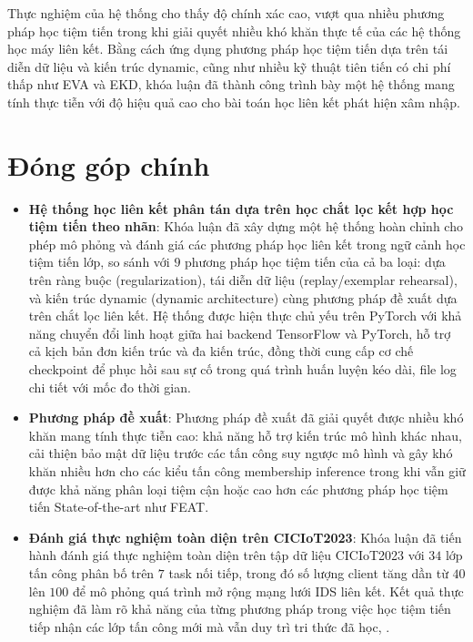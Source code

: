 Thực nghiệm của hệ thống cho thấy độ chính xác cao, vượt qua nhiều phương pháp học tiệm tiến trong khi giải quyết nhiều khó khăn thực tế của các hệ thống học máy liên kết. Bằng cách ứng dụng phương pháp học tiệm tiến dựa trên tái diễn dữ liệu và kiến trúc dynamic, cũng như nhiều kỹ thuật tiên tiến có chi phí thấp như EVA và EKD, khóa luận đã thành công trình bày một hệ thống mang tính thực tiễn với độ hiệu quả cao cho bài toán học liên kết phát hiện xâm nhập.

\section{Đóng góp chính}

\begin{itemize}
    \item \textbf{Hệ thống học liên kết phân tán dựa trên học chắt lọc kết hợp học tiệm tiến theo nhãn}: Khóa luận đã xây dựng một hệ thống hoàn chỉnh cho phép mô phỏng và đánh giá các phương pháp học liên kết trong ngữ cảnh học tiệm tiến lớp, so sánh với $9$ phương pháp học tiệm tiến của cả ba loại: dựa trên ràng buộc (regularization), tái diễn dữ liệu (replay/exemplar rehearsal), và kiến trúc dynamic (dynamic architecture) cùng phương pháp đề xuất dựa trên chắt lọc liên kết. Hệ thống được hiện thực chủ yếu trên PyTorch với khả năng chuyển đổi linh hoạt giữa hai backend TensorFlow và PyTorch, hỗ trợ cả kịch bản đơn kiến trúc và đa kiến trúc, đồng thời cung cấp cơ chế checkpoint để phục hồi sau sự cố trong quá trình huấn luyện kéo dài, file log chi tiết với mốc đo thời gian.
    
    \item \textbf{Phương pháp đề xuất}: Phương pháp đề xuất đã giải quyết được nhiều khó khăn mang tính thực tiễn cao: khả năng hỗ trợ kiến trúc mô hình khác nhau, cải thiện bảo mật dữ liệu trước các tấn công suy ngược mô hình và gây khó khăn nhiều hơn cho các kiểu tấn công membership inference trong khi vẫn giữ được khả năng phân loại tiệm cận hoặc cao hơn các phương pháp học tiệm tiến State-of-the-art như FEAT.
    
    
    \item \textbf{Đánh giá thực nghiệm toàn diện trên CICIoT2023}: Khóa luận đã tiến hành đánh giá thực nghiệm toàn diện trên tập dữ liệu CICIoT2023 với $34$ lớp tấn công phân bố trên $7$ task nối tiếp, trong đó số lượng client tăng dần từ $40$ lên $100$ để mô phỏng quá trình mở rộng mạng lưới IDS liên kết. Kết quả thực nghiệm đã làm rõ khả năng của từng phương pháp trong việc học tiệm tiến tiếp nhận các lớp tấn công mới mà vẫn duy trì tri thức đã học, .
\end{itemize}

